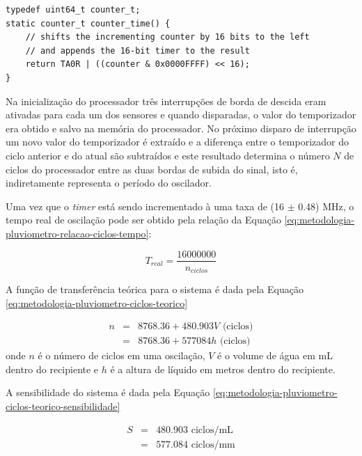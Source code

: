 \documentclass[a4paper]{instrumentacao}
\begin{document}
\begin{lstlisting}[caption=Rotina de extração do timer do temporizador]
typedef uint64_t counter_t;
static counter_t counter_time() {
    // shifts the incrementing counter by 16 bits to the left
    // and appends the 16-bit timer to the result
    return TA0R | ((counter & 0x0000FFFF) << 16);
}
\end{lstlisting}

Na inicialização do processador três interrupções de borda de descida eram ativadas para cada um dos sensores e quando disparadas, o valor do temporizador era obtido e salvo na memória do processador. No próximo disparo de interrupção um novo valor do temporizador é extraído e a diferença entre o temporizador do ciclo anterior e do atual são subtraídos e este resultado determina o número $N$ de ciclos do processador entre as duas bordas de subida do sinal, isto é, indiretamente representa o período do oscilador.

Uma vez que o \textit{timer} está sendo incrementado à uma taxa de (16 $\pm$ 0.48) MHz, o tempo real de oscilação pode ser obtido pela relação da Equação \ref{eq:metodologia-pluviometro-relacao-ciclos-tempo}:

\begin{equation}
	T_{real} = \frac{16 000 000}{n_{ciclos}}
	\label{eq:metodologia-pluviometro-relacao-ciclos-tempo}
\end{equation}

A função de transferência teórica para o sistema é dada pela Equação \ref{eq:metodologia-pluviometro-ciclos-teorico}

\begin{eqnarray}
	n &=& 8768.36 + 480.903 V \text{ (ciclos)} \label{eq:metodologia-pluviometro-ciclos-teorico} \\
	  &=& 8768.36 + 577084 h \text{ (ciclos)} \nonumber
\end{eqnarray}
\noindent onde $n$ é o número de ciclos em uma oscilação, $V$ é o volume de água em mL dentro do recipiente e $h$ é a altura de líquido em metros dentro do recipiente.

A sensibilidade do sistema é dada pela Equação \ref{eq:metodologia-pluviometro-ciclos-teorico-sensibilidade}

\begin{eqnarray}
	S &=& 480.903 \text{ ciclos/mL} \label{eq:metodologia-pluviometro-ciclos-teorico-sensibilidade} \\
	  &=& 577.084 \text{ ciclos/mm} \nonumber
\end{eqnarray}
\end{document}
